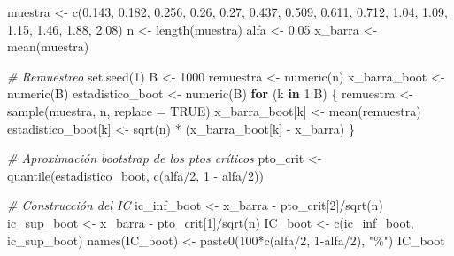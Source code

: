 \documentclass[
]{book}
\newenvironment{Shaded}{\begin{snugshade}}{\end{snugshade}}
\newcommand{\AttributeTok}[1]{\textcolor[rgb]{0.77,0.63,0.00}{#1}}
\newcommand{\CommentTok}[1]{\textcolor[rgb]{0.56,0.35,0.01}{\textit{#1}}}
\newcommand{\ConstantTok}[1]{\textcolor[rgb]{0.00,0.00,0.00}{#1}}
\newcommand{\ControlFlowTok}[1]{\textcolor[rgb]{0.13,0.29,0.53}{\textbf{#1}}}
\newcommand{\DecValTok}[1]{\textcolor[rgb]{0.00,0.00,0.81}{#1}}
\newcommand{\FloatTok}[1]{\textcolor[rgb]{0.00,0.00,0.81}{#1}}
\newcommand{\FunctionTok}[1]{\textcolor[rgb]{0.00,0.00,0.00}{#1}}
\newcommand{\NormalTok}[1]{#1}
\newcommand{\OtherTok}[1]{\textcolor[rgb]{0.56,0.35,0.01}{#1}}
\newcommand{\SpecialCharTok}[1]{\textcolor[rgb]{0.00,0.00,0.00}{#1}}
\newcommand{\StringTok}[1]{\textcolor[rgb]{0.31,0.60,0.02}{#1}}
\theoremstyle{break}
\theoremstyle{definition}
\theoremstyle{definition}
\theoremstyle{definition}
\theoremstyle{definition}
\theoremstyle{remark}
\begin{document}
\begin{Shaded}
\begin{Highlighting}[]
\NormalTok{muestra }\OtherTok{\textless{}{-}} \FunctionTok{c}\NormalTok{(}\FloatTok{0.143}\NormalTok{, }\FloatTok{0.182}\NormalTok{, }\FloatTok{0.256}\NormalTok{, }\FloatTok{0.26}\NormalTok{, }\FloatTok{0.27}\NormalTok{, }\FloatTok{0.437}\NormalTok{, }\FloatTok{0.509}\NormalTok{, }
             \FloatTok{0.611}\NormalTok{, }\FloatTok{0.712}\NormalTok{, }\FloatTok{1.04}\NormalTok{, }\FloatTok{1.09}\NormalTok{, }\FloatTok{1.15}\NormalTok{, }\FloatTok{1.46}\NormalTok{, }\FloatTok{1.88}\NormalTok{, }\FloatTok{2.08}\NormalTok{)}
\NormalTok{n }\OtherTok{\textless{}{-}} \FunctionTok{length}\NormalTok{(muestra)}
\NormalTok{alfa }\OtherTok{\textless{}{-}} \FloatTok{0.05}
\NormalTok{x\_barra }\OtherTok{\textless{}{-}} \FunctionTok{mean}\NormalTok{(muestra)}

\CommentTok{\# Remuestreo}
\FunctionTok{set.seed}\NormalTok{(}\DecValTok{1}\NormalTok{)}
\NormalTok{B }\OtherTok{\textless{}{-}} \DecValTok{1000}
\NormalTok{remuestra }\OtherTok{\textless{}{-}} \FunctionTok{numeric}\NormalTok{(n)}
\NormalTok{x\_barra\_boot }\OtherTok{\textless{}{-}} \FunctionTok{numeric}\NormalTok{(B) }
\NormalTok{estadistico\_boot }\OtherTok{\textless{}{-}} \FunctionTok{numeric}\NormalTok{(B)}
\ControlFlowTok{for}\NormalTok{ (k }\ControlFlowTok{in} \DecValTok{1}\SpecialCharTok{:}\NormalTok{B) \{}
\NormalTok{  remuestra }\OtherTok{\textless{}{-}} \FunctionTok{sample}\NormalTok{(muestra, n, }\AttributeTok{replace =} \ConstantTok{TRUE}\NormalTok{)}
\NormalTok{  x\_barra\_boot[k] }\OtherTok{\textless{}{-}} \FunctionTok{mean}\NormalTok{(remuestra)}
\NormalTok{  estadistico\_boot[k] }\OtherTok{\textless{}{-}} \FunctionTok{sqrt}\NormalTok{(n) }\SpecialCharTok{*}\NormalTok{ (x\_barra\_boot[k] }\SpecialCharTok{{-}}\NormalTok{ x\_barra)}
\NormalTok{\}}

\CommentTok{\# Aproximación bootstrap de los ptos críticos}
\NormalTok{pto\_crit }\OtherTok{\textless{}{-}} \FunctionTok{quantile}\NormalTok{(estadistico\_boot, }\FunctionTok{c}\NormalTok{(alfa}\SpecialCharTok{/}\DecValTok{2}\NormalTok{, }\DecValTok{1} \SpecialCharTok{{-}}\NormalTok{ alfa}\SpecialCharTok{/}\DecValTok{2}\NormalTok{))}

\CommentTok{\# Construcción del IC}
\NormalTok{ic\_inf\_boot }\OtherTok{\textless{}{-}}\NormalTok{ x\_barra }\SpecialCharTok{{-}}\NormalTok{ pto\_crit[}\DecValTok{2}\NormalTok{]}\SpecialCharTok{/}\FunctionTok{sqrt}\NormalTok{(n)}
\NormalTok{ic\_sup\_boot }\OtherTok{\textless{}{-}}\NormalTok{ x\_barra }\SpecialCharTok{{-}}\NormalTok{ pto\_crit[}\DecValTok{1}\NormalTok{]}\SpecialCharTok{/}\FunctionTok{sqrt}\NormalTok{(n)}
\NormalTok{IC\_boot }\OtherTok{\textless{}{-}} \FunctionTok{c}\NormalTok{(ic\_inf\_boot, ic\_sup\_boot)}
\FunctionTok{names}\NormalTok{(IC\_boot) }\OtherTok{\textless{}{-}} \FunctionTok{paste0}\NormalTok{(}\DecValTok{100}\SpecialCharTok{*}\FunctionTok{c}\NormalTok{(alfa}\SpecialCharTok{/}\DecValTok{2}\NormalTok{, }\DecValTok{1}\SpecialCharTok{{-}}\NormalTok{alfa}\SpecialCharTok{/}\DecValTok{2}\NormalTok{), }\StringTok{"\%"}\NormalTok{)}
\NormalTok{IC\_boot}
\end{Highlighting}
\end{Shaded}
\end{document}
